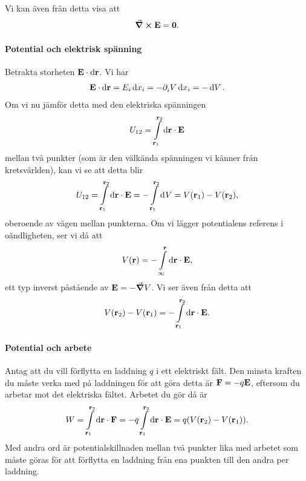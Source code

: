 Vi kan även från detta visa att
\begin{align*}
	\curl{\vb{E}} = \vb{0}.
\end{align*}

\paragraph{Potential och elektrisk spänning}
Betrakta storheten $\vb{E}\cdot\dd{\vb{r}}$. Vi har
\begin{align*}
	\vb{E}\cdot\dd{\vb{r}} = E_{i}\dd{x_{i}} = -\partial_{i}^{}V\dd{x_{i}} = -\dd{V}.
\end{align*}
Om vi nu jämför detta med den elektriska spänningen
\begin{align*}
	U_{12} = \int\limits_{\vb{r}_{1}}^{\vb{r}_{2}}\dd{\vb{\vb{r}}}\cdot \vb{E}
\end{align*}
mellan två punkter (som är den välkända spänningen vi känner från kretsvärlden), kan vi se att detta blir
\begin{align*}
	U_{12} = \int\limits_{\vb{r}_{1}}^{\vb{r}_{2}}\dd{\vb{\vb{r}}}\cdot \vb{E} = -\int\limits_{\vb{r}_{1}}^{\vb{r}_{2}}\dd[]{V} = V(\vb{r}_{1}) - V(\vb{r}_{2}),
\end{align*}
oberoende av vägen mellan punkterna. Om vi lägger potentialens referens i oändligheten, ser vi då att
\begin{align*}
	V(\vb{r}) = -\int\limits_{\infty}^{\vb{r}}\dd{\vb{\vb{r}}}\cdot \vb{E},
\end{align*}
ett typ inverst påstående av $\vb{E} = -\grad{V}$. Vi ser även från detta att
\begin{align*}
	V(\vb{r}_{2}) - V(\vb{r}_{1}) = -\int\limits_{\vb{r}_{1}}^{\vb{r}_{2}}\dd{\vb{\vb{r}}}\cdot \vb{E}.
\end{align*}

\paragraph{Potential och arbete}
Antag att du vill förflytta en laddning $q$ i ett elektriskt fält. Den minsta kraften du måste verka med på laddningen för att göra detta är $\vb{F} = -q\vb{E}$, eftersom du arbetar mot det elektriska fältet. Arbetet du gör då är
\begin{align*}
	W = \int\limits_{\vb{r}_{1}}^{\vb{r}_{2}}\dd{\vb{\vb{r}}}\cdot \vb{F} = -q\int\limits_{\vb{r}_{1}}^{\vb{r}_{2}}\dd{\vb{\vb{r}}}\cdot \vb{E} = q(V(\vb{r}_{2}) - V(\vb{r}_{1})).
\end{align*}
Med andra ord är potentialskillnaden mellan två punkter lika med arbetet som måste göras för att förflytta en laddning från ena punkten till den andra per laddning.

